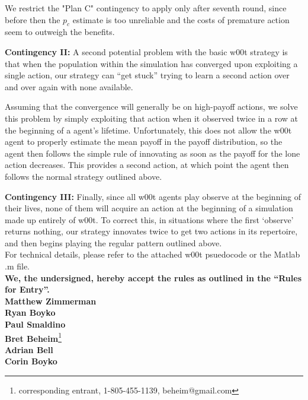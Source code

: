 \documentclass[11pt]{article}
\begin{document}
We restrict the "Plan C" contingency to apply only after seventh round, since before then the $p_c$ estimate is too unreliable and the costs of premature action seem to outweigh the benefits.


\textbf{Contingency II:} A second potential problem with the basic w00t strategy is that when the population within the simulation has converged upon exploiting a single action, our  strategy can ``get stuck'' trying to learn a second action over and over again with none available.

Assuming that the convergence will generally be on high-payoff actions, we solve this problem by simply exploiting that action when it observed twice in a row at the beginning of a agent's lifetime.  Unfortunately, this does not allow the w00t agent to properly estimate the mean payoff in the payoff distribution, so the agent then follows the simple rule of innovating as soon as the payoff for the lone action decreases. This provides a second action, at which point the agent then follows the normal strategy outlined above.  

\textbf{Contingency III:} Finally, since all w00t agents play observe at the beginning of their lives, none of them will acquire an action at the beginning of a simulation made up entirely of w00t.  To correct this, in situations where the first `observe' returns nothing, our strategy innovates twice to get two actions in its repertoire, and then begins playing the regular pattern outlined above.\\


For technical details, please refer to the attached w00t psuedocode or the Matlab .m file.\\

  

\textbf{We, the undersigned, hereby accept the rules as outlined in the ``Rules for Entry''.}\\

\noindent\textbf{Matthew Zimmerman}\\
\textbf{Ryan Boyko}\\
\textbf{Paul Smaldino}\\
\textbf{Bret Beheim}\footnote{corresponding entrant, 1-805-455-1139, beheim@gmail.com}\\
\textbf{Adrian Bell}\\
\textbf{Corin Boyko}\\
\end{document}
